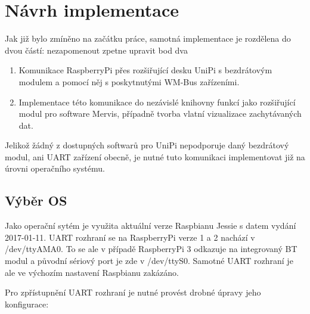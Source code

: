 \chapter{Návrh implementace}
Jak již bylo zmíněno na začátku práce, samotná implementace je rozdělena do dvou částí: \colorbox[rgb]{0,1,0}{nezapomenout zpetne upravit bod dva}
\begin{enumerate}
	\item Komunikace RaspberryPi přes rozšiřující desku UniPi s bezdrátovým modulem a pomocí něj s poskytnutými WM-Bus zařízeními.
	\item Implementace této komunikace do nezávislé knihovny funkcí jako rozšiřující modul pro software Mervis, případně tvorba vlatní vizualizace zachytávaných dat. 
\end{enumerate}

Jelikož žádný z dostupných softwarů pro UniPi nepodporuje daný bezdrátový modul, ani UART zařízení obecně, je nutné tuto komunikaci implementovat již na úrovni operačního systému.


\section{Výběr OS}
Jako operační sytém je využita aktuální verze Raspbianu Jessie s datem vydání 2017-01-11. UART rozhraní se na RaspberryPi verze 1 a 2 nachází v /dev/ttyAMA0. To se ale v případě RaspberryPi 3 odkazuje na integrovaný BT modul a původní sériový port je zde v /dev/ttyS0. Samotné UART rozhraní je ale ve výchozím nastavení Raspbianu zakázáno.

Pro zpřístupnění UART rozhraní je nutné provést drobné úpravy jeho konfigurace:


